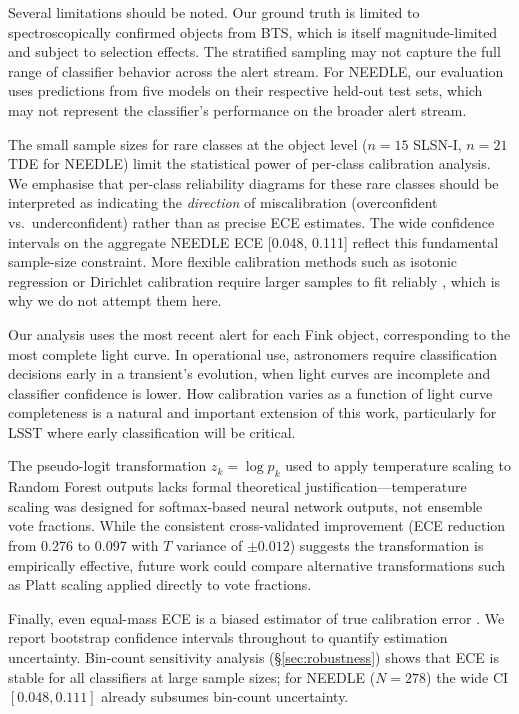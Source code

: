 \documentclass[twocolumn]{aastex631}
\begin{document}
Several limitations should be noted. Our ground truth is limited to spectroscopically confirmed objects from BTS, which is itself magnitude-limited and subject to selection effects. The stratified sampling may not capture the full range of classifier behavior across the alert stream. For NEEDLE, our evaluation uses predictions from five models on their respective held-out test sets, which may not represent the classifier's performance on the broader alert stream.

The small sample sizes for rare classes at the object level ($n = 15$ SLSN-I, $n = 21$ TDE for NEEDLE) limit the statistical power of per-class calibration analysis. We emphasise that per-class reliability diagrams for these rare classes should be interpreted as indicating the \emph{direction} of miscalibration (overconfident vs.\ underconfident) rather than as precise ECE estimates. The wide confidence intervals on the aggregate NEEDLE ECE [0.048, 0.111] reflect this fundamental sample-size constraint. More flexible calibration methods such as isotonic regression or Dirichlet calibration require larger samples to fit reliably \citep{vaicenavicius2019}, which is why we do not attempt them here.

Our analysis uses the most recent alert for each Fink object, corresponding to the most complete light curve. In operational use, astronomers require classification decisions early in a transient's evolution, when light curves are incomplete and classifier confidence is lower. How calibration varies as a function of light curve completeness is a natural and important extension of this work, particularly for LSST where early classification will be critical.

The pseudo-logit transformation $z_k = \log p_k$ used to apply temperature scaling to Random Forest outputs lacks formal theoretical justification---temperature scaling was designed for softmax-based neural network outputs, not ensemble vote fractions. While the consistent cross-validated improvement (ECE reduction from 0.276 to 0.097 with $T$ variance of $\pm 0.012$) suggests the transformation is empirically effective, future work could compare alternative transformations such as Platt scaling applied directly to vote fractions.

Finally, even equal-mass ECE is a biased estimator of true calibration error \citep{roelofs2022}. We report bootstrap confidence intervals throughout to quantify estimation uncertainty. Bin-count sensitivity analysis (\S\ref{sec:robustness}) shows that ECE is stable for all classifiers at large sample sizes; for NEEDLE ($N = 278$) the wide CI $[0.048, 0.111]$ already subsumes bin-count uncertainty.
\end{document}
